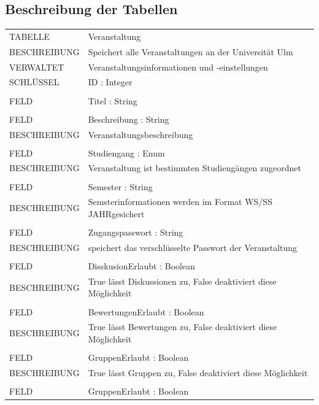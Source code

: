 \documentclass[12pt,a4paper]{article}
\begin{document}
\subsection{Beschreibung der Tabellen}
\begin{tabular}{|lp{12cm}|}
\hline
TABELLE			&  Veranstaltung\\ 
BESCHREIBUNG	&  Speichert alle Veranstaltungen an der Universität Ulm\\ 
VERWALTET		&  Veranstaltungsinformationen und -einstellungen\\ 
SCHLÜSSEL		&  ID : Integer\\ 
\hline
&  \\ 
FELD		    &  Titel : String\\  
				&  \\
FELD		    &  Beschreibung : String\\ 
BESCHREIBUNG	&  Veranstaltungsbeschreibung\\
				&  \\
FELD		    &  Studiengang : Enum\\ 
BESCHREIBUNG	&  Veranstaltung ist bestimmten Studiengängen zugeordnet\\ 
				&  \\
FELD		    &  Semester : String\\ 
BESCHREIBUNG	&  Semsterinformationen werden im Format \glqq WS/SS JAHR\grqq gesichert \\
				&  \\
FELD		    &  Zugangspasswort : String\\ 
BESCHREIBUNG	&  speichert das verschlüsselte Passwort der Veranstaltung\\
				&  \\
FELD		    &  DisskusionErlaubt : Boolean\\ 
BESCHREIBUNG	&  True lässt Diskussionen zu, False deaktiviert diese Möglichkeit \\
				&  \\
FELD		    &  BewertungenErlaubt : Boolean\\ 
BESCHREIBUNG	&  True lässt Bewertungen zu, False deaktiviert diese Möglichkeit \\
				&  \\
FELD		    &  GruppenErlaubt : Boolean\\ 
BESCHREIBUNG	&  True lässt Gruppen zu, False deaktiviert diese Möglichkeit \\
				&  \\
FELD		    &  GruppenErlaubt : Boolean\\ 

\end{tabular}
\end{document}
